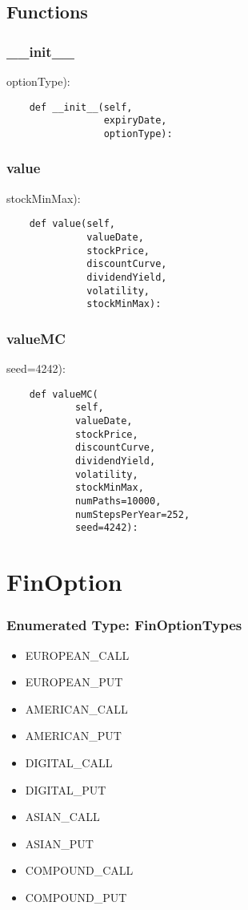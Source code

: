 \documentclass[twoside,11pt]{book}
\begin{document}
\subsection*{Functions}

\subsubsection*{{\bf \_\_init\_\_}}
optionType): 

\begin{lstlisting}
    def __init__(self,
                 expiryDate,
                 optionType):
\end{lstlisting}

\subsubsection*{{\bf value}}
stockMinMax): 

\begin{lstlisting}
    def value(self,
              valueDate,
              stockPrice,
              discountCurve,
              dividendYield,
              volatility,
              stockMinMax):
\end{lstlisting}

\subsubsection*{{\bf valueMC}}
seed=4242): 

\begin{lstlisting}
    def valueMC(
            self,
            valueDate,
            stockPrice,
            discountCurve,
            dividendYield,
            volatility,
            stockMinMax,
            numPaths=10000,
            numStepsPerYear=252,
            seed=4242):
\end{lstlisting}

\newpage
\section{FinOption}

\subsubsection{Enumerated Type: FinOptionTypes}
\begin{itemize}
\item{EUROPEAN\_CALL}
\item{EUROPEAN\_PUT}
\item{AMERICAN\_CALL}
\item{AMERICAN\_PUT}
\item{DIGITAL\_CALL}
\item{DIGITAL\_PUT}
\item{ASIAN\_CALL}
\item{ASIAN\_PUT}
\item{COMPOUND\_CALL}
\item{COMPOUND\_PUT}
\end{itemize}
\end{document}
